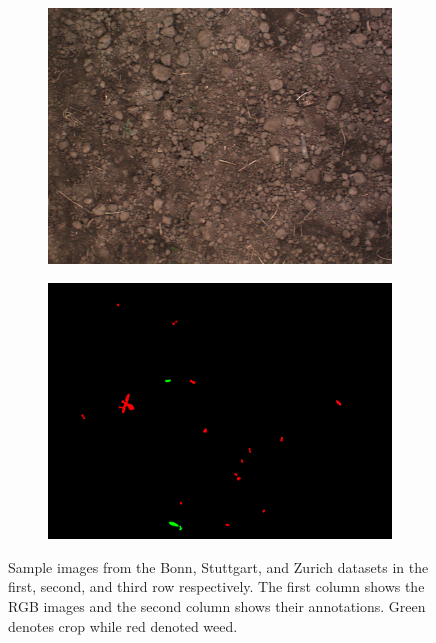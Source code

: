 \documentclass[letterpaper, 10 pt, conference]{ieeeconf}  %
\begin{document}
\begin{figure}
\begin{subfigure}[b]{0.49\linewidth}
   \end{subfigure}
        \begin{subfigure}[b]{0.49\linewidth}
    \includegraphics[width=\linewidth]{pics/zurich/images/bonirob_2016-10-13-09-03-00_0_frame66.png}
   		\caption{}
		\label{zurich_img}    		
    \vspace{1em}
   \end{subfigure}
        \begin{subfigure}[b]{0.49\linewidth}
    \includegraphics[width=\linewidth]{pics/zurich/annotations/bonirob_2016-10-13-09-03-00_0_frame66.png}
   		\caption{}
		\label{zurich_lbl}    		
    \vspace{1em}
   \end{subfigure}
    \caption{Sample images from the Bonn, Stuttgart, and Zurich datasets in the first, second, and third row respectively. The first column shows the RGB images and the second column shows their annotations. Green denotes crop while red denoted weed.}
    \label{fig:datasets_images}
\end{figure}
\end{document}
